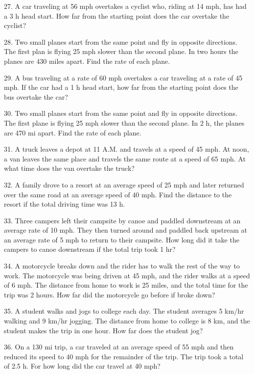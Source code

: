 \documentclass[11pt]{book}
\theoremstyle{definition}  %
\begin{document}
27. A car traveling at 56 mph overtakes a cyclist who, riding at 14 mph, has
had a 3 h head start. How far from the starting point does the
car overtake the cyclist?

28. Two small planes start from the same point and fly in opposite directions.
The first plan is flying 25 mph slower than the second
plane. In two hours the planes are 430 miles apart. Find
the rate of each plane.

29. A bus traveling at a rate of 60 mph overtakes a car traveling at a rate of
45 mph. If the car had a 1 h head start, how far from the
starting point does the bus overtake the car?

30. Two small planes start from the same point and fly in opposite directions.
The first plane is flying 25 mph slower than the second
plane. In 2 h, the planes are 470 mi apart. Find the
rate of each plane.

31. A truck leaves a depot at 11 A.M. and travels at a speed of 45 mph. At
noon, a van leaves the same place and travels the same route at a
speed of 65 mph. At what time does the van overtake the truck?

32. A family drove to a resort at an average speed of 25 mph and later
returned over the same road at an average speed of 40 mph.
Find the distance to the resort if the total driving time was
13 h.

33. Three campers left their campsite by canoe and paddled downstream at an average rate of 10 mph. They then turned around and paddled
back upstream at an average rate of 5 mph
to return to their campsite. How long did it take the campers
to canoe downstream if the total trip took 1 hr?

\pagebreak

34. A motorcycle breaks down and the rider has to walk the rest of the way to
work. The motorcycle was being driven at 45 mph, and the
rider walks at a speed of 6 mph. The distance from home to
work is 25 miles, and the total time for the trip was 2
hours. How far did the motorcycle go before if broke down?

35. A student walks and jogs to college each day. The student averages 5 km/hr
walking and 9 km/hr jogging. The distance from home to college
is 8 km, and the student makes the trip in one hour. How
far does the student jog?

36. On a 130 mi trip, a car traveled at an average speed of 55 mph and then reduced its speed to 40 mph for the remainder of the
trip. The trip took a total of 2.5 h. For how long did the
car travel at 40 mph?
\end{document}

